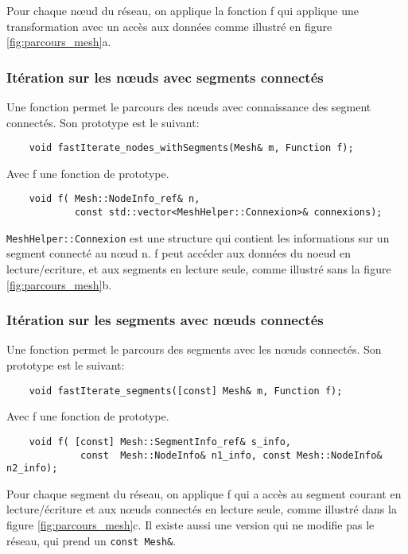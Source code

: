 Pour chaque nœud du réseau, on applique la fonction f qui applique une transformation avec un accès aux données comme illustré en figure \ref{fig:parcours_mesh}a.

\subsubsection{Itération sur les nœuds avec segments connectés}

Une fonction permet le parcours des nœuds avec connaissance des segment connectés.  Son prototype est le suivant:

\begin{verbatim}
    void fastIterate_nodes_withSegments(Mesh& m, Function f);
\end{verbatim}
Avec f une fonction de prototype.
\begin{verbatim}
    void f( Mesh::NodeInfo_ref& n, 
            const std::vector<MeshHelper::Connexion>& connexions);
\end{verbatim}


\verb|MeshHelper::Connexion| est une structure qui contient les informations sur un segment connecté au nœud n. f peut accéder aux données du noeud en lecture/ecriture, et aux segments en lecture seule, comme illustré sans la figure \ref{fig:parcours_mesh}b.

\subsubsection{Itération sur les segments avec nœuds connectés}

Une fonction permet le parcours des segments avec les nœuds connectés. Son prototype est le suivant:

\begin{verbatim}
    void fastIterate_segments([const] Mesh& m, Function f);
\end{verbatim}
Avec f une fonction de prototype.
\begin{verbatim}
    void f( [const] Mesh::SegmentInfo_ref& s_info, 
             const  Mesh::NodeInfo& n1_info, const Mesh::NodeInfo& n2_info);
\end{verbatim}

Pour chaque segment du réseau, on applique f qui a accès au segment courant en lecture/écriture et aux nœuds connectés en lecture seule, comme illustré dans la figure \ref{fig:parcours_mesh}c. Il existe aussi une version qui ne modifie pas le réseau, qui prend un \verb|const Mesh&|.

